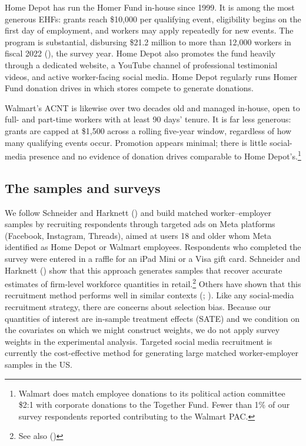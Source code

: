 \documentclass[
  11pt,
  oneside]{article}
\begin{document}
Home Depot has run the Homer Fund in-house since 1999. It is among the most generous EHFs: grants reach \$10,000 per qualifying event, eligibility begins on the first day of employment, and workers may apply repeatedly for new events. The program is substantial, disbursing \$21.2 million to more than 12,000 workers in fiscal 2022 (), the survey year. Home Depot also promotes the fund heavily through a dedicated website, a YouTube channel of professional testimonial videos, and active worker-facing social media. Home Depot regularly runs Homer Fund donation drives in which stores compete to generate donations.

Walmart's ACNT is likewise over two decades old and managed in-house, open to full- and part-time workers with at least 90 days' tenure. It is far less generous: grants are capped at \$1,500 across a rolling five-year window, regardless of how many qualifying events occur. Promotion appears minimal; there is little social-media presence and no evidence of donation drives comparable to Home Depot's.\footnote{Walmart does match employee donations to its political action committee \$2:1 with corporate donations to the Together Fund. Fewer than 1\% of our survey respondents reported contributing to the Walmart PAC.}

\subsection{The samples and surveys}\label{the-samples-and-surveys}

We follow Schneider and Harknett () and build matched worker--employer samples by recruiting respondents through targeted ads on Meta platforms (Facebook, Instagram, Threads), aimed at users 18 and older whom Meta identified as Home Depot or Walmart employees. Respondents who completed the survey were entered in a raffle for an iPad Mini or a Visa gift card. Schneider and Harknett () show that this approach generates samples that recover accurate estimates of firm-level workforce quantities in retail.\footnote{See also ()} Others have shown that this recruitment method performs well in similar contexts (; ). Like any social-media recruitment strategy, there are concerns about selection bias. Because our quantities of interest are in-sample treatment effects (SATE) and we condition on the covariates on which we might construct weights, we do not apply survey weights in the experimental analysis. Targeted social media recruitment is currently the cost-effective method for generating large matched worker-employer samples in the US.
\end{document}
